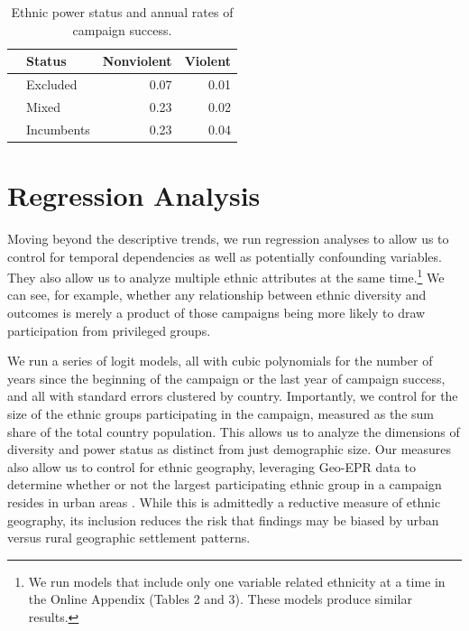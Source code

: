 \documentclass[
  letterpaper,
  DIV=11,
  numbers=noendperiod]{scrartcl}
\begin{document}
\begin{table}
\centering
\caption{Ethnic power status and annual rates of campaign success.}
\centering
\begin{tabular}[t]{llrr}
\toprule
  & Status & Nonviolent & Violent\\
\midrule
 & Excluded & \num{0.07} & \num{0.01}\\
 & Mixed & \num{0.23} & \num{0.02}\\
 & Incumbents & \num{0.23} & \num{0.04}\\
\bottomrule
\end{tabular}
\end{table}

\section{Regression Analysis}\label{regression-analysis}

Moving beyond the descriptive trends, we run regression analyses to
allow us to control for temporal dependencies as well as potentially
confounding variables. They also allow us to analyze multiple ethnic
attributes at the same time.\footnote{We run models that include only
  one variable related ethnicity at a time in the Online Appendix
  (Tables 2 and 3). These models produce similar results.} We can see,
for example, whether any relationship between ethnic diversity and
outcomes is merely a product of those campaigns being more likely to
draw participation from privileged groups.

We run a series of logit models, all with cubic polynomials for the
number of years since the beginning of the campaign or the last year of
campaign success, and all with standard errors clustered by country.
Importantly, we control for the size of the ethnic groups participating
in the campaign, measured as the sum share of the total country
population. This allows us to analyze the dimensions of diversity and
power status as distinct from just demographic size. Our measures also
allow us to control for ethnic geography, leveraging Geo-EPR data to
determine whether or not the largest participating ethnic group in a
campaign resides in urban areas \autocite{Wucherpfennig2011}. While this
is admittedly a reductive measure of ethnic geography, its inclusion
reduces the risk that findings may be biased by urban versus rural
geographic settlement patterns.
\end{document}
